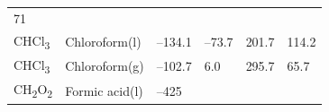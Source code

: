 \documentclass[
  9pt,
]{extbook}
\theoremstyle{definition}
\theoremstyle{definition}
\theoremstyle{definition}
\theoremstyle{remark}
\begin{document}
\begin{longtable}[]{@{}llllll@{}}
\begin{minipage}[t]{0.14\columnwidth}
71\strut
\end{minipage}\tabularnewline
\begin{minipage}[t]{0.07\columnwidth}\raggedright
CHCl\textsubscript{3}\strut
\end{minipage} & \begin{minipage}[t]{0.17\columnwidth}\raggedright
Chloroform(l)\strut
\end{minipage} & \begin{minipage}[t]{0.15\columnwidth}\raggedright
--134.1\strut
\end{minipage} & \begin{minipage}[t]{0.15\columnwidth}\raggedright
--73.7\strut
\end{minipage} & \begin{minipage}[t]{0.14\columnwidth}\raggedright
201.7\strut
\end{minipage} & \begin{minipage}[t]{0.14\columnwidth}\raggedright
114.2\strut
\end{minipage}\tabularnewline
\begin{minipage}[t]{0.07\columnwidth}\raggedright
CHCl\textsubscript{3}\strut
\end{minipage} & \begin{minipage}[t]{0.17\columnwidth}\raggedright
Chloroform(g)\strut
\end{minipage} & \begin{minipage}[t]{0.15\columnwidth}\raggedright
--102.7\strut
\end{minipage} & \begin{minipage}[t]{0.15\columnwidth}\raggedright
6.0\strut
\end{minipage} & \begin{minipage}[t]{0.14\columnwidth}\raggedright
295.7\strut
\end{minipage} & \begin{minipage}[t]{0.14\columnwidth}\raggedright
65.7\strut
\end{minipage}\tabularnewline
\begin{minipage}[t]{0.07\columnwidth}\raggedright
CH\textsubscript{2}O\textsubscript{2}\strut
\end{minipage} & \begin{minipage}[t]{0.17\columnwidth}\raggedright
Formic acid(l)\strut
\end{minipage} & \begin{minipage}[t]{0.15\columnwidth}\raggedright
--425\strut
\end{minipage} & \begin{minipage}[t]{0.15\columnwidth}\raggedright

\end{minipage}
\end{longtable}
\end{document}
